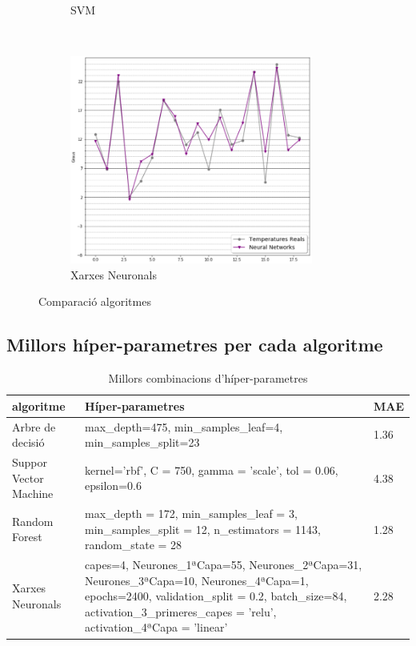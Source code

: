 \documentclass[10pt,a4paper,twocolumn,twoside]{article}
\begin{document}
\begin{figure}[htb!]
\begin{subfigure}[htb!]{0.5\textwidth}
	\caption{SVM}
	\label{fig-SVM}
    \end{subfigure}
    ~ %
    \begin{subfigure}[htb!]{0.5\textwidth}
	\includegraphics[width=80mm]{../img/XarxesNeurPredict}
	\caption{Xarxes Neuronals}
	\label{fig-NN}
    \end{subfigure}
    \caption{Comparació algoritmes}\label{compAlgs}
\end{figure}
\clearpage
\subsection{Millors híper-parametres per cada algoritme}
\begin{table}[th]
\caption{Millors combinacions d'híper-parametres}
\begin{center}
\begin{tabular}{  P{3.5cm}| P{10cm} |P{1cm}}
\hline\hline 
\textbf{algoritme} & \textbf{Híper-parametres} & \textbf{MAE}\\
\hline
Arbre de decisió & max\_depth=475, min\_samples\_leaf=4, min\_samples\_split=23 & 1.36 \\
\hline
Suppor Vector Machine & kernel='rbf', C = 750, gamma = 'scale', tol = 0.06, epsilon=0.6 & 4.38\\
\hline
Random Forest & max\_depth = 172, min\_samples\_leaf = 3, min\_samples\_split = 12, n\_estimators = 1143, random\_state = 28 & 1.28\\
\hline
Xarxes Neuronals & capes=4, Neurones\_1ªCapa=55, Neurones\_2ªCapa=31, Neurones\_3ªCapa=10, Neurones\_4ªCapa=1, epochs=2400, validation\_split = 0.2, batch\_size=84, activation\_3\_primeres\_capes = 'relu', activation\_4ªCapa = 'linear' & 2.28\\
\hline
\hline
\end{tabular}
\end{center}
\end{table}
\end{document}

